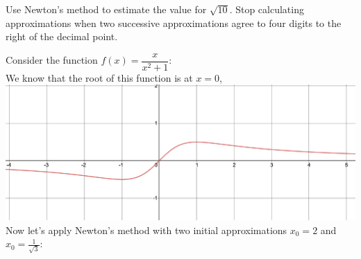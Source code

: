 \begin{examplebox}{}
Use Newton's method to estimate the value for $\sqrt{10}$.
Stop calculating approximations when two successive approximations agree to four digits to the right of the decimal point.
\end{examplebox}

\newpage

\begin{examplebox}{}
Consider the function $f(x)=\dfrac{x}{x^2+1}$:\\

We know that the root of this function is at $x=0$,\\

\includegraphics[scale=0.5]{pics/new5}\\

Now let's apply Newton's method with two initial approximations $x_0 = 2$ and $x_0=\frac{1}{\sqrt{3}}$:
\end{examplebox}

